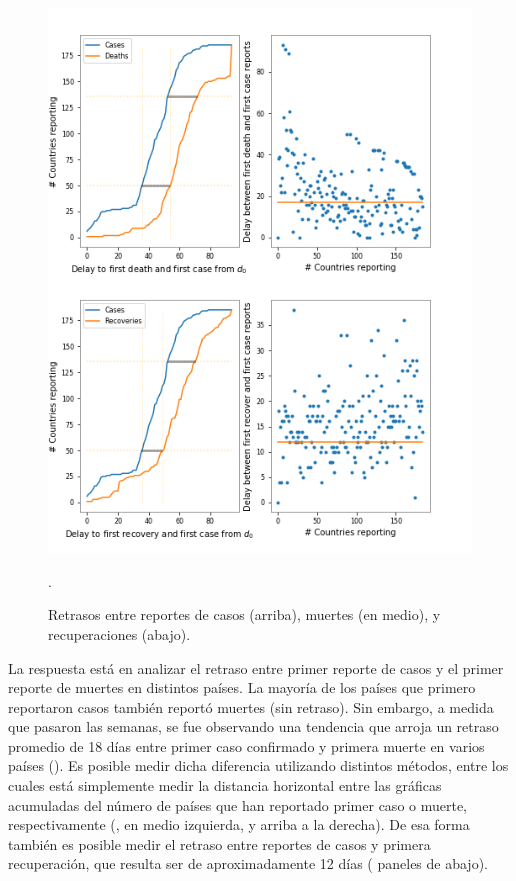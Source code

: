 \documentclass[8pt]{article}
\begin{document}
\begin{figure}[h]
\begin{minipage}{0.5\textwidth}
\includegraphics[width=\textwidth]
{../figures_COVID19_dataAnalysis/dam_COVID19_JHU_delays_caseDeaths}
\end{minipage}%
\caption{Retrasos entre reportes de casos (arriba), muertes (en medio), y recuperaciones (abajo). }. \label{fig:reportArrivals}
\end{figure}


La respuesta está en analizar el retraso entre primer reporte de casos y el primer reporte de muertes en distintos países. La mayoría de los países que primero reportaron casos también reportó muertes (sin retraso). Sin embargo, a medida que pasaron las semanas, se fue observando una tendencia que arroja un retraso promedio de 18 días entre primer caso confirmado y primera muerte en varios países (). Es posible medir dicha diferencia utilizando distintos métodos, entre los cuales está simplemente medir la distancia horizontal entre las gráficas acumuladas del número de países que han reportado primer caso o muerte, respectivamente (, en medio izquierda, y arriba a la derecha). 
De esa forma también es posible medir el retraso entre reportes de casos y primera recuperación, que resulta ser de aproximadamente 12 días  ( paneles de abajo).
\end{document}
